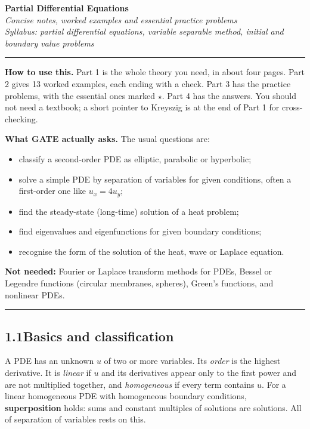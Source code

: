 \documentclass[11pt]{article}
\newcommand{\sect}[1]{\Needspace{8\baselineskip}\vspace{1.1em}{\Large\textbf{#1}}\par\vspace{-0.3em}\rule{\textwidth}{0.8pt}\par\vspace{0.2em}}
\begin{document}
\begin{center}
{\LARGE \textbf{Partial Differential Equations}}\\[0.5em]
{\large \textit{Concise notes, worked examples and essential practice problems}}\\[0.3em]
{\large \textit{Syllabus: partial differential equations, variable separable method, initial and boundary value problems}}
\end{center}
\rule{\textwidth}{0.8pt}

\textbf{How to use this.} Part 1 is the whole theory you need, in about four pages. Part 2 gives 13 worked examples, each ending with a check. Part 3 has the practice problems, with the essential ones marked $\star$. Part 4 has the answers. You should not need a textbook; a short pointer to Kreyszig is at the end of Part 1 for cross-checking.

\vspace{0.3em}
\textbf{What GATE actually asks.} The usual questions are:
\begin{itemize}
  \item classify a second-order PDE as elliptic, parabolic or hyperbolic;
  \item solve a simple PDE by separation of variables for given conditions, often a first-order one like $u_x=4u_y$;
  \item find the steady-state (long-time) solution of a heat problem;
  \item find eigenvalues and eigenfunctions for given boundary conditions;
  \item recognise the form of the solution of the heat, wave or Laplace equation.
\end{itemize}
\textbf{Not needed:} Fourier or Laplace transform methods for PDEs, Bessel or Legendre functions (circular membranes, spheres), Green's functions, and nonlinear PDEs.

\newpage
\sect{Part 1: Notes}

\subsection*{1.1\quad Basics and classification}

A PDE has an unknown $u$ of two or more variables. Its \emph{order} is the highest derivative. It is \emph{linear} if $u$ and its derivatives appear only to the first power and are not multiplied together, and \emph{homogeneous} if every term contains $u$. For a linear homogeneous PDE with homogeneous boundary conditions, \textbf{superposition} holds: sums and constant multiples of solutions are solutions. All of separation of variables rests on this.
\end{document}
